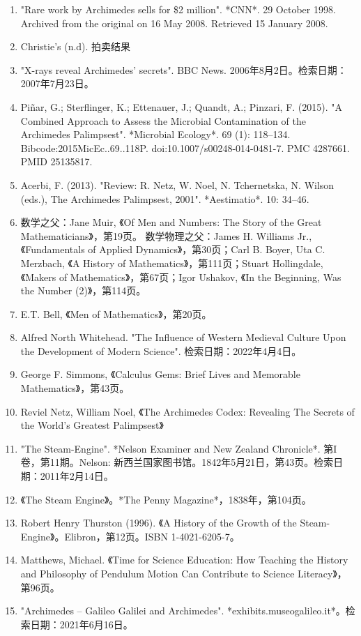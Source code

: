 \begin{enumerate}
\item "Rare work by Archimedes sells for \$2 million". *CNN*. 29 October 1998. Archived from the original on 16 May 2008. Retrieved 15 January 2008.
\item Christie's (n.d). 拍卖结果
\item "X-rays reveal Archimedes' secrets". BBC News. 2006年8月2日。检索日期：2007年7月23日。
\item Piñar, G.; Sterflinger, K.; Ettenauer, J.; Quandt, A.; Pinzari, F. (2015). "A Combined Approach to Assess the Microbial Contamination of the Archimedes Palimpsest". *Microbial Ecology*. 69 (1): 118–134. Bibcode:2015MicEc..69..118P. doi:10.1007/s00248-014-0481-7. PMC 4287661. PMID 25135817.
\item Acerbi, F. (2013). "Review: R. Netz, W. Noel, N. Tchernetska, N. Wilson (eds.), The Archimedes Palimpsest, 2001". *Aestimatio*. 10: 34–46.
\item 数学之父：Jane Muir, 《Of Men and Numbers: The Story of the Great Mathematicians》，第19页。
数学物理之父：James H. Williams Jr., 《Fundamentals of Applied Dynamics》，第30页；Carl B. Boyer, Uta C. Merzbach, 《A History of Mathematics》，第111页；Stuart Hollingdale, 《Makers of Mathematics》，第67页；Igor Ushakov, 《In the Beginning, Was the Number (2)》，第114页。
\item E.T. Bell, 《Men of Mathematics》，第20页。
\item Alfred North Whitehead. "The Influence of Western Medieval Culture Upon the Development of Modern Science". 检索日期：2022年4月4日。
\item George F. Simmons, 《Calculus Gems: Brief Lives and Memorable Mathematics》，第43页。
\item Reviel Netz, William Noel, 《The Archimedes Codex: Revealing The Secrets of the World's Greatest Palimpsest》
\item "The Steam-Engine". *Nelson Examiner and New Zealand Chronicle*. 第I卷，第11期。Nelson: 新西兰国家图书馆。1842年5月21日，第43页。检索日期：2011年2月14日。
\item 《The Steam Engine》。*The Penny Magazine*，1838年，第104页。
\item Robert Henry Thurston (1996). 《A History of the Growth of the Steam-Engine》。Elibron，第12页。ISBN 1-4021-6205-7。
\item Matthews, Michael. 《Time for Science Education: How Teaching the History and Philosophy of Pendulum Motion Can Contribute to Science Literacy》，第96页。
\item "Archimedes – Galileo Galilei and Archimedes". *exhibits.museogalileo.it*。检索日期：2021年6月16日。

\end{enumerate}
